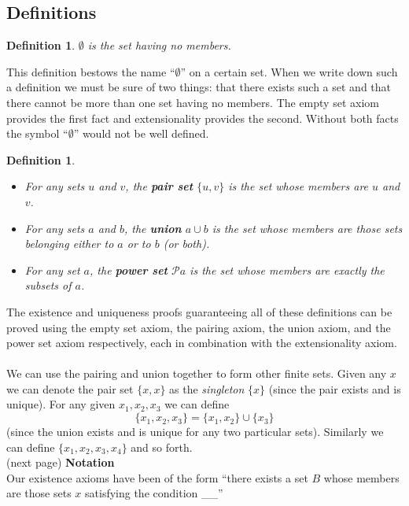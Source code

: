 \documentclass{report}
\newtheorem{definition}[theo]{Definition}
\begin{document}
\subsection{Definitions}
\begin{definition}
$\emptyset$ is the set having no members.
\end{definition}
\noindent This definition bestows the name ``$\emptyset$'' on a certain set. When we write down such a definition we must be sure of two things: that there exists such a set and that there cannot be more 
than one set having no members. The empty set axiom provides the first fact and extensionality provides the second.
Without both facts the symbol ``$\emptyset$'' would not be well defined.
\begin{definition}\hspace{1mm}
\begin{itemize}
\item For any sets $u$ and $v$, the \textbf{pair set} $\{u,v\}$ is the set whose members are $u$ and $v$.
\item For any sets $a$ and $b$, the \textbf{union} $a\cup b$ is the set whose members are those sets belonging either to $a$ or to $b$ (or both).
\item For any set $a$, the \textbf{power set} $\mathscr Pa$ is the set whose members are exactly the subsets of $a$.
\end{itemize}
\end{definition}
\noindent The existence and uniqueness proofs guaranteeing all of these definitions can be proved using the empty set axiom, the pairing axiom, the union axiom, and the power set axiom respectively,
each in combination with the extensionality axiom.\\
\vspace{1mm}\\
We can use the pairing and union together to form other finite sets. Given any $x$ we can denote the pair set $\{x,x\}$ as the \textit{singleton} $\{x\}$ (since the pair exists and is unique). 
For any given $x_1,x_2,x_3$ we can define
\begin{equation*}
\{x_1,x_2,x_3\}=\{x_1,x_2\}\cup\{x_3\}
\end{equation*}
(since the union exists and is unique for any two particular sets). Similarly we can define $\{x_1,x_2,x_3,x_4\}$ and so forth.\\
(next page)\newpage
\noindent\textbf{Notation}\\
Our existence axioms have been of the form ``there exists a set $B$ whose members are those sets $x$ satisfying the condition \_\_''
\end{document}
